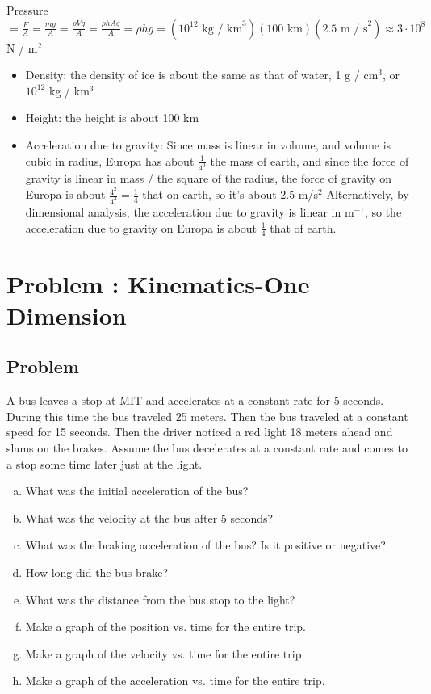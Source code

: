 \documentclass[solutions]{esg8012pset}
\begin{document}
  Pressure $ = \frac{F}{A} = \frac{mg}{A} = \frac{\rho Vg}{A} = \frac{\rho h A g}{A} = \rho h g = (10^{12}\text{ kg / km}^3)(100\text{ km})(2.5\text{ m / s}^2) \approx 3\cdot 10^8$ N / m$^2$
  \begin{itemize}
    \item Density: the density of ice is about the same as that of water, 1 g / cm$^3$, or $10^{12}$ kg / km$^3$
    \item Height: the height is about 100 km
    \item Acceleration due to gravity: Since mass is linear in volume, and volume is cubic in radius, Europa has about $\frac{1}{4^3}$ the mass of earth, and since the force of gravity is linear in mass / the square of the radius, the force of gravity on Europa is about $\frac{4^2}{4^3} = \frac{1}{4}$ that on earth, so it's about 2.5 m/s$^2$  Alternatively, by dimensional analysis, the acceleration due to gravity is linear in m$^{-1}$, so the acceleration due to gravity on Europa is about $\frac{1}{4}$ that of earth.
  \end{itemize}
\section{Problem \thesection: Kinematics-One Dimension}
\subsection{Problem}
  A bus leaves a stop at MIT and accelerates at a constant rate for 5 seconds. During this time the
  bus traveled 25 meters. Then the bus traveled at a constant speed for 15 seconds. Then the driver
  noticed a red light 18 meters ahead and slams on the brakes. Assume the bus decelerates at a
  constant rate and comes to a stop some time later just at the light.
  \begin{enumerate}[a)]
    \item What was the initial acceleration of the bus?
    \item What was the velocity at the bus after 5 seconds?
    \item What was the braking acceleration of the bus? Is it positive or negative?
    \item How long did the bus brake?
    \item What was the distance from the bus stop to the light?
    \item Make a graph of the position vs. time for the entire trip.
    \item Make a graph of the velocity vs. time for the entire trip.
    \item Make a graph of the acceleration vs. time for the entire trip.
  \end{enumerate}
\end{document}
